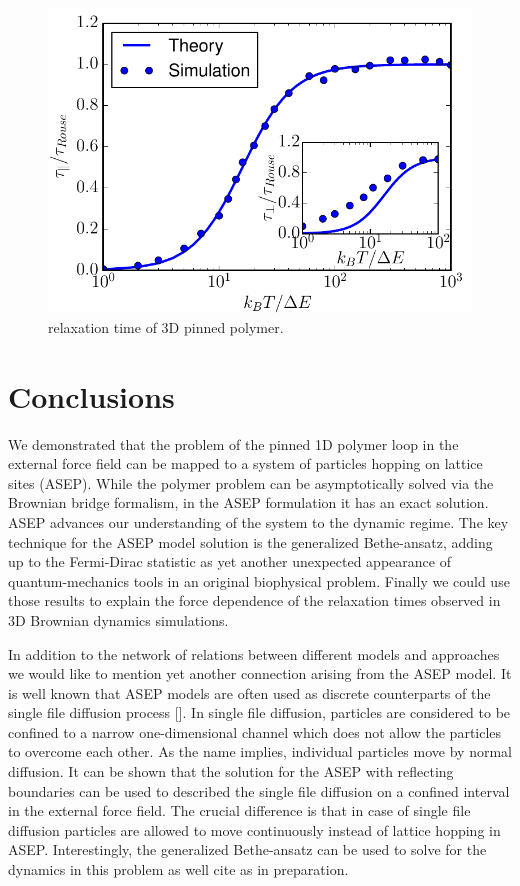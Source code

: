 \documentclass[aps,showpacs,twocolumn,floatfix,prx,superscriptaddress]{revtex4-1}
\begin{document}
\begin{figure}[htpb]
    \centering
    \includegraphics[width=1.0\linewidth]{relaxation3D}
    \caption{relaxation time of 3D pinned polymer.}
    \label{fig:relaxation3D}
\end{figure}
 
\section{Conclusions}
We demonstrated that the problem of the pinned 1D polymer loop in the external force field can be mapped to a system of particles hopping on lattice sites (ASEP). While the polymer problem can be asymptotically solved via the Brownian bridge formalism, in the ASEP formulation it has an exact solution. ASEP advances our understanding of the system to the dynamic regime. The key technique for the ASEP model solution is the generalized Bethe-ansatz, adding up to the Fermi-Dirac statistic as yet another unexpected appearance of quantum-mechanics tools in an original biophysical problem. Finally we could use those results to explain the force dependence of the relaxation times observed in 3D Brownian dynamics simulations.

In addition to the network of relations between different models and approaches we would like to mention yet another connection arising from the ASEP model. It is well known that ASEP models are often used as discrete counterparts of the single file diffusion process []. In single file diffusion, particles are considered to be confined to a narrow one-dimensional channel which does not allow the particles to overcome each other. As the name implies, individual particles move by normal diffusion. It can be shown that the solution for the ASEP with reflecting boundaries can be used to described the single file diffusion on a confined interval in the external force field. The crucial difference is that in case of single file diffusion particles are allowed to move continuously instead of lattice hopping in ASEP. Interestingly, the generalized Bethe-ansatz can be used to solve for the dynamics in this problem as well \cite{} cite as in preparation. 
\end{document}
